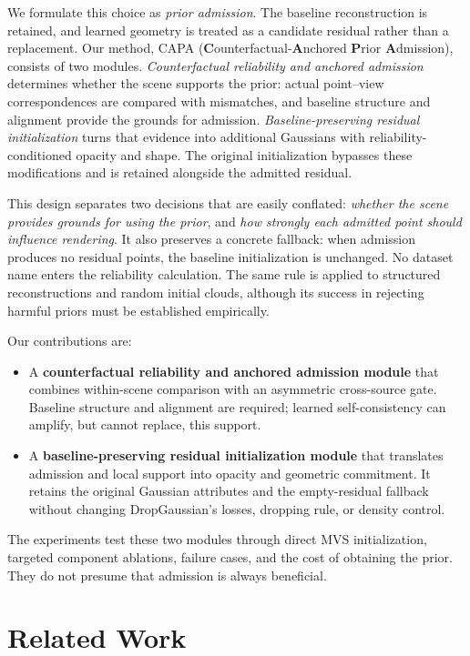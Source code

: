 \documentclass{article}
\newcommand{\ours}{CAPA}
\begin{document}
We formulate this choice as \emph{prior admission}. The baseline reconstruction is retained, and learned geometry is treated as a candidate residual rather than a replacement. Our method, \ours{} (\textbf{C}ounterfactual-\textbf{A}nchored \textbf{P}rior \textbf{A}dmission), consists of two modules. \emph{Counterfactual reliability and anchored admission} determines whether the scene supports the prior: actual point--view correspondences are compared with mismatches, and baseline structure and alignment provide the grounds for admission. \emph{Baseline-preserving residual initialization} turns that evidence into additional Gaussians with reliability-conditioned opacity and shape. The original initialization bypasses these modifications and is retained alongside the admitted residual.

This design separates two decisions that are easily conflated: \emph{whether the scene provides grounds for using the prior}, and \emph{how strongly each admitted point should influence rendering}. It also preserves a concrete fallback: when admission produces no residual points, the baseline initialization is unchanged. No dataset name enters the reliability calculation. The same rule is applied to structured reconstructions and random initial clouds, although its success in rejecting harmful priors must be established empirically.

Our contributions are:
\begin{itemize}
\item A \textbf{counterfactual reliability and anchored admission module} that combines within-scene comparison with an asymmetric cross-source gate. Baseline structure and alignment are required; learned self-consistency can amplify, but cannot replace, this support.
\item A \textbf{baseline-preserving residual initialization module} that translates admission and local support into opacity and geometric commitment. It retains the original Gaussian attributes and the empty-residual fallback without changing DropGaussian's losses, dropping rule, or density control.
\end{itemize}
The experiments test these two modules through direct MVS initialization, targeted component ablations, failure cases, and the cost of obtaining the prior. They do not presume that admission is always beneficial.

\section{Related Work}
\label{sec:related}
\end{document}
